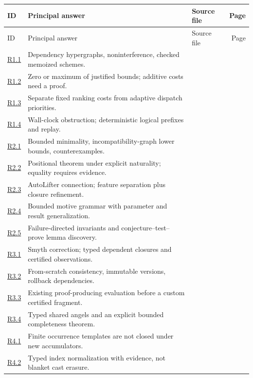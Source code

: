 \documentclass[11pt,a4paper]{article}
\newcommand{\qref}[1]{\hyperref[q:#1]{#1}}
\theoremstyle{definition}
\theoremstyle{remark}
\begin{document}
\begin{longtable}{@{}P{14mm}P{79mm}P{43mm}r@{}}
\toprule
ID & Principal answer & Source file & Page\\\midrule
\endfirsthead
\toprule ID & Principal answer & Source file & Page\\\midrule
\endhead
\qref{R1.1}&Dependency hypergraphs, noninterference, checked memoized schemes.&&\pageref{q:R1.1}\\
\qref{R1.2}&Zero or maximum of justified bounds; additive costs need a proof.&&\pageref{q:R1.2}\\
\qref{R1.3}&Separate fixed ranking costs from adaptive dispatch priorities.&&\pageref{q:R1.3}\\
\qref{R1.4}&Wall-clock obstruction; deterministic logical prefixes and replay.&&\pageref{q:R1.4}\\
\qref{R2.1}&Bounded minimality, incompatibility-graph lower bounds, counterexamples.&&\pageref{q:R2.1}\\
\qref{R2.2}&Positional theorem under explicit naturality; equality requires evidence.&&\pageref{q:R2.2}\\
\qref{R2.3}&AutoLifter connection; feature separation plus closure refinement.&&\pageref{q:R2.3}\\
\qref{R2.4}&Bounded motive grammar with parameter and result generalization.&&\pageref{q:R2.4}\\
\qref{R2.5}&Failure-directed invariants and conjecture--test--prove lemma discovery.&&\pageref{q:R2.5}\\
\qref{R3.1}&Smyth correction; typed dependent closures and certified observations.&&\pageref{q:R3.1}\\
\qref{R3.2}&From-scratch consistency, immutable versions, rollback dependencies.&&\pageref{q:R3.2}\\
\qref{R3.3}&Existing proof-producing evaluation before a custom certified fragment.&&\pageref{q:R3.3}\\
\qref{R3.4}&Typed shared angels and an explicit bounded completeness theorem.&&\pageref{q:R3.4}\\
\qref{R4.1}&Finite occurrence templates are not closed under new accumulators.&&\pageref{q:R4.1}\\
\qref{R4.2}&Typed index normalization with evidence, not blanket cast erasure.&&\pageref{q:R4.2}\\

\end{longtable}
\end{document}
